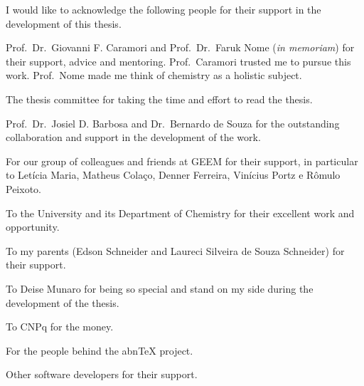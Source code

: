 \begin{agradecimentos}
I would like to acknowledge the following people for their support in the
development of this thesis.

Prof.\ Dr.\ Giovanni F. Caramori and
Prof.\ Dr.\ Faruk Nome (\emph{in memoriam})
for their support, advice and mentoring.
Prof.\ Caramori trusted me to pursue this work.
Prof.\ Nome made me think of chemistry as a holistic subject.

The thesis committee for taking the time and effort to read the thesis.

Prof.\ Dr.\ Josiel D. Barbosa and
Dr.\ Bernardo de Souza
for the outstanding collaboration and support in the development of the work.

For our group of colleagues and friends at GEEM for their support, in particular to
Letícia Maria, Matheus Colaço, Denner Ferreira, Vinícius Portz e Rômulo Peixoto.

To the University and its Department of Chemistry
for their excellent work and opportunity.

To my parents (Edson Schneider and Laureci Silveira de Souza Schneider)
for their support.

To Deise Munaro for being so special
and stand on my side during the development of the thesis.

To CNPq for the money.

For the people behind the abn\TeX{} project.

Other software developers for their support.

\end{agradecimentos}
